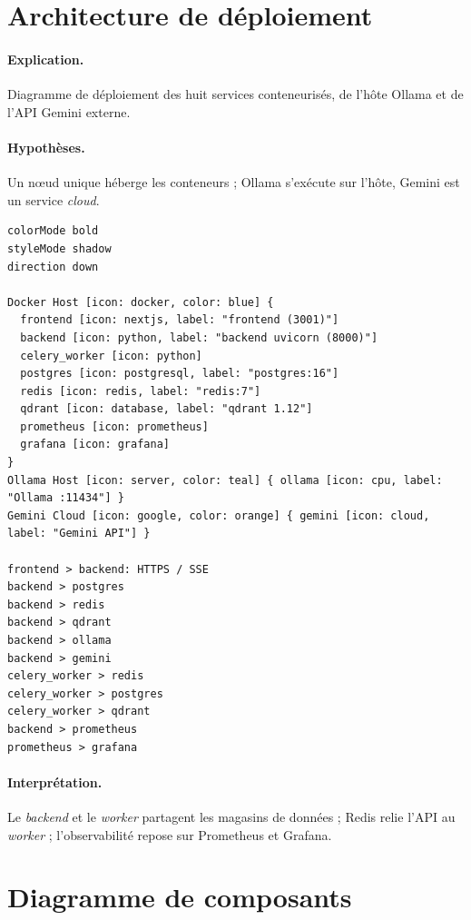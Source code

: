 \section{Architecture de déploiement}
\paragraph{Explication.} Diagramme de déploiement des huit services conteneurisés,
de l'hôte Ollama et de l'API Gemini externe.
\paragraph{Hypothèses.} Un n{\oe}ud unique héberge les conteneurs ; Ollama
s'exécute sur l'hôte, Gemini est un service \emph{cloud}.

\begin{lstlisting}[style=eraser,caption={Diagramme de déploiement (Eraser)},label={lst:deploy}]
colorMode bold
styleMode shadow
direction down

Docker Host [icon: docker, color: blue] {
  frontend [icon: nextjs, label: "frontend (3001)"]
  backend [icon: python, label: "backend uvicorn (8000)"]
  celery_worker [icon: python]
  postgres [icon: postgresql, label: "postgres:16"]
  redis [icon: redis, label: "redis:7"]
  qdrant [icon: database, label: "qdrant 1.12"]
  prometheus [icon: prometheus]
  grafana [icon: grafana]
}
Ollama Host [icon: server, color: teal] { ollama [icon: cpu, label: "Ollama :11434"] }
Gemini Cloud [icon: google, color: orange] { gemini [icon: cloud, label: "Gemini API"] }

frontend > backend: HTTPS / SSE
backend > postgres
backend > redis
backend > qdrant
backend > ollama
backend > gemini
celery_worker > redis
celery_worker > postgres
celery_worker > qdrant
backend > prometheus
prometheus > grafana
\end{lstlisting}

\paragraph{Interprétation.} Le \emph{backend} et le \emph{worker} partagent les
magasins de données ; Redis relie l'API au \emph{worker} ; l'observabilité repose
sur Prometheus et Grafana.

\section{Diagramme de composants}
